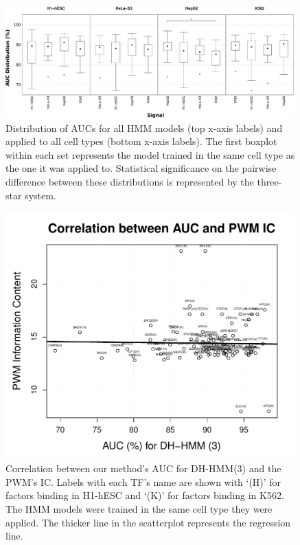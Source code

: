 \documentclass{bioinfo}
\begin{document}
\begin{figure}[t]
\centering
     \includegraphics[width=0.99\textwidth]{Figs/CellType}
\caption{Distribution of AUCs for all HMM models (top x-axis labels) and applied to all cell types (bottom x-axis labels). The first boxplot within each set represents the model trained in the same cell type as the one it was applied to. Statistical significance on the pairwise difference between these distributions is represented by the three-star system.}
\label{fig:celltype.test}
\end{figure}


\begin{figure}[t]
\centering
     \includegraphics[width=0.99\textwidth]{Figs/TfQuality_Correlation}
\caption{{\color{black} Correlation between our method's AUC for DH-HMM(3) and the PWM's IC. Labels with each TF's name are shown with `(H)' for factors binding in H1-hESC and `(K)' for factors binding in K562. The HMM models were trained in the same cell type they were applied. The thicker line in the scatterplot represents the regression line.}}
\label{fig:tftest.corr}
\end{figure}
\end{document}
